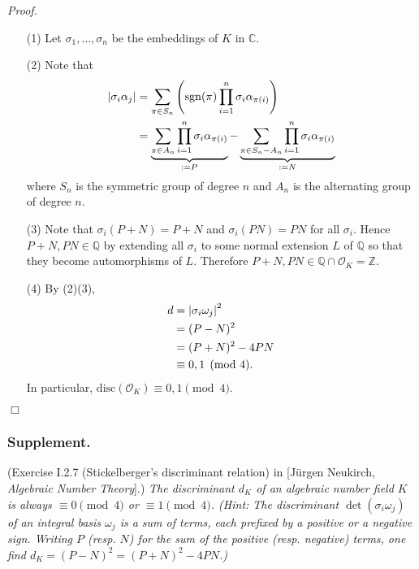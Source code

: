 \documentclass{article}
\begin{document}
\emph{Proof.}
\begin{enumerate}
\item[(1)]
  Let $\sigma_1, \ldots, \sigma_n$ be the embeddings of $K$ in $\mathbb{C}$.

\item[(2)]
  Note that
  \begin{align*}
    \abs{\sigma_i \alpha_j}
    &= \sum_{\pi \in S_n}
      \left( \mathrm{sgn}(\pi) \prod_{i=1}^{n} \sigma_i \alpha_{\pi(i)} \right) \\
    &= \underbrace{\sum_{\pi \in A_n} \prod_{i=1}^{n} \sigma_i \alpha_{\pi(i)}}_{:= P}
      - \underbrace{\sum_{\pi \in S_n - A_n} \prod_{i=1}^{n} \sigma_i \alpha_{\pi(i)}}_{:= N}
  \end{align*}
  where
  $S_n$ is the symmetric group of degree $n$
  and $A_n$ is the alternating group of degree $n$.

\item[(3)]
  Note that $\sigma_i(P+N) = P+N$ and $\sigma_i(PN) = PN$ for all $\sigma_i$.
  Hence $P+N, PN \in \mathbb{Q}$
  by extending all $\sigma_i$ to some normal extension $L$ of $\mathbb{Q}$ so that
  they become automorphisms of $L$.
  Therefore $P+N, PN \in \mathbb{Q} \cap \mathcal{O}_K = \mathbb{Z}$.

\item[(4)]
  By (2)(3),
  \begin{align*}
    d
    &= \abs{\sigma_i \omega_j}^2 \\
    &= (P-N)^2 \\
    &= (P+N)^2 - 4PN \\
    &\equiv 0, 1 \pmod 4.
  \end{align*}
  In particular, $\mathrm{disc}(\mathcal{O}_K) \equiv 0, 1 \pmod{4}$.
\end{enumerate}
$\Box$ \\



\subsubsection*{Supplement.}
(Exercise I.2.7 (Stickelberger's discriminant relation)
in [J\"urgen Neukirch, \emph{Algebraic Number Theory}].)
\emph{The discriminant $d_K$ of an algebraic number field $K$ is always
$\equiv 0 \pmod 4$ or $\equiv 1 \pmod 4$.
(Hint: The discriminant $\det(\sigma_i \omega_j)$ of an integral basis $\omega_j$
is a sum of terms, each prefixed by a positive or a negative sign.
Writing $P$ (resp. $N$) for the sum of the positive (resp. negative) terms,
one find $d_K = (P-N)^2 = (P+N)^2 - 4PN$.)} \\
\end{document}
